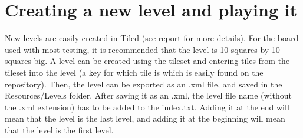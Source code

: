 \documentclass[]{report}
\begin{document}
\section*{Creating a new level and playing it}
New levels are easily created in Tiled (see report for more details). For the board used with most testing,
it is recommended that the level is 10 squares by 10 squares big. A level can be
created using the tileset and entering tiles from the tileset into the level
(a key for which tile is which is easily found on the repository). Then, the 
level can be exported as an .xml file, and saved in the Resources/Levels folder.
After saving it as an .xml, the level file name (without the .xml extension)
has to be added to the index.txt. Adding it at the end will mean that the level
is the last level, and adding it at the beginning will mean that the level is
the first level.
\end{document}
